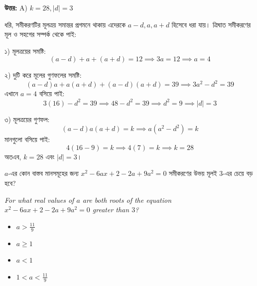\documentclass[12pt, a4paper]{article}
\begin{document}
\vspace{0.5em}
\begin{tcolorbox}[answerbox]
    \textbf{\color{success} উত্তর:} A) $k = 28, |d| = 3$
\end{tcolorbox}
\vspace{1em}

\begin{tcolorbox}[solutionbox={সমাধান (Solution)}]
    \noindent
    ধরি, সমীকরণটির মূলত্রয় সমান্তর প্রগমনে থাকায় এদেরকে $a-d, a, a+d$ হিসেবে ধরা যায়। ত্রিঘাত সমীকরণের মূল ও সহগের সম্পর্ক থেকে পাই:
    
    \vspace{0.5em}
    ১) মূলত্রয়ের সমষ্টি:
    \[ (a-d) + a + (a+d) = 12 \implies 3a = 12 \implies a = 4 \]
    
    \vspace{0.5em}
    ২) দুটি করে মূলের গুণফলের সমষ্টি:
    \[ (a-d)a + a(a+d) + (a-d)(a+d) = 39 \implies 3a^2 - d^2 = 39 \]
    এখানে $a = 4$ বসিয়ে পাই:
    \[ 3(16) - d^2 = 39 \implies 48 - d^2 = 39 \implies d^2 = 9 \implies |d| = 3 \]
    
    \vspace{0.5em}
    ৩) মূলত্রয়ের গুণফল:
    \[ (a-d)a(a+d) = k \implies a(a^2 - d^2) = k \]
    মানগুলো বসিয়ে পাই:
    \[ 4(16 - 9) = k \implies 4(7) = k \implies k = 28 \]
    অতএব, $k = 28$ এবং $|d| = 3$।
\end{tcolorbox}
\begin{tcolorbox}[questionbox={প্রশ্ন (Question) 43}]
    \noindent
    $a$-এর কোন বাস্তব মানসমূহের জন্য $x^2 - 6ax + 2 - 2a + 9a^2 = 0$ সমীকরণের উভয় মূলই $3$-এর চেয়ে বড় হবে?
    
    \vspace{0.8em}
    \begin{english}
    \noindent\textit{\color{darkgray}
    For what real values of $a$ are both roots of the equation $x^2 - 6ax + 2 - 2a + 9a^2 = 0$ greater than $3$?
    }
    \end{english}
\end{tcolorbox}

\begin{itemize}[label={}, leftmargin=1cm, itemsep=0.5em]
    \item[\textbf{A)}] $a > \frac{11}{9}$
    \item[\textbf{B)}] $a \ge 1$
    \item[\textbf{C)}] $a < 1$
    \item[\textbf{D)}] $1 < a < \frac{11}{9}$
\end{itemize}
\end{document}

